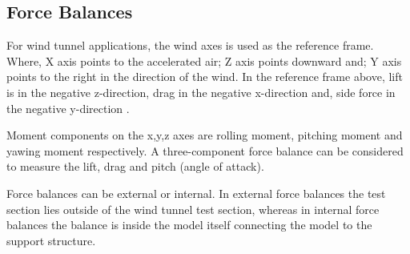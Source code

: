 \subsection{Force Balances}
For wind tunnel applications, the wind axes is used as the reference frame. Where, X axis points to the accelerated air; Z axis points downward and; Y axis points to the right in the direction of the wind. In the reference frame above, lift is in the negative z-direction, drag in the negative x-direction and, side force in the negative y-direction \cite{bueno2018design}.

Moment components on the x,y,z axes are rolling moment, pitching moment and yawing moment respectively. A three-component force balance can be considered to measure the lift, drag and pitch (angle of attack).

Force balances can be external or internal. In external force balances the test section lies outside of the wind tunnel test section, whereas in internal force balances the balance is inside the model itself connecting the model to the support structure.
